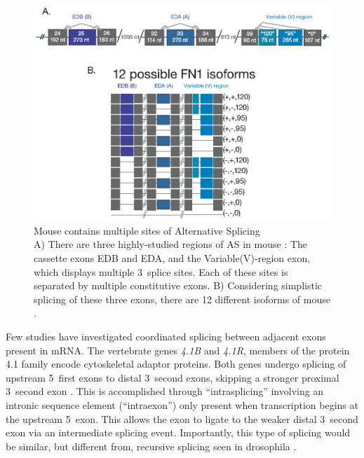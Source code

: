     \begin{figure} %
      \centering 
      \includegraphics{Figures/Intro/Fibronectin.eps}
      \caption[Mouse \fn{} contains multiple sites of Alternative Splicing]
      {
        Mouse \fn{} contains multiple sites of Alternative Splicing\\[0.25cm]
        A) There are three highly-studied regions of AS in mouse \fn{}: The cassette exons EDB and EDA, and the Variable(V)-region exon, which displays multiple 3\textprime~splice sites.  Each of these sites is separated by multiple constitutive exons. B) Considering simplistic splicing of these three exons, there are 12 different isoforms of mouse \fn{}.
        }
      \label{Intro:fig:mouseFn1}
      \end{figure}

    Few studies have investigated coordinated splicing between adjacent exons present in mRNA. The vertebrate genes \textit{4.1B} and \textit{4.1R}, members of the protein 4.1 family encode cytoskeletal adaptor proteins. Both genes undergo splicing of upstream 5\textprime~first exons to distal 3\textprime~second exons, skipping a stronger proximal 3\textprime~second exon \citep{Parra2008, Parra2012}. This is accomplished through ``intrasplicing'' involving an intronic sequence element (``intraexon'') only present when transcription begins at the upstream 5\textprime~exon. This allows the exon to ligate to the weaker distal 3\textprime~second exon via an intermediate splicing event. Importantly, this type of splicing would be similar, but different from, recursive splicing seen in drosophila \citep{Burnette2005a}.

